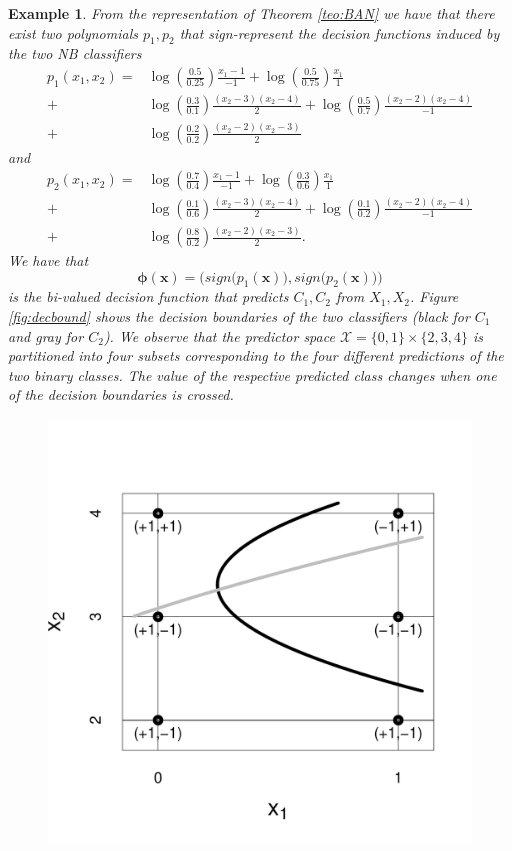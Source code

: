 \documentclass[11pt,a4paper, twoside]{book}
\newtheorem{example}{Example}[chapter]
\newcommand{\bchi}{\boldsymbol{\mathcal{X}}}
\begin{document}
\begin{example}
\begin{table}
\end{table}
From the representation of Theorem \ref{teo:BAN} we have that there exist two polynomials $p_1,p_2$ that sign-represent the decision functions induced by the two NB classifiers
\begin{align*}
p_1(x_1,x_2) =&\log\left(\frac{0.5}{0.25}\right) \frac{x_1-1}{-1} + \log\left( \frac{0.5}{0.75} \right) \frac{x_1}{1}  \\ 
          +& \log\left(\frac{0.3}{0.1}\right) \frac{(x_2-3)(x_2-4)}{2} + \log\left(\frac{0.5}{0.7}\right) \frac{(x_2-2)(x_2-4)}{-1} \\
   +& \log\left(\frac{0.2}{0.2}\right) \frac{(x_2-2)(x_2-3)}{2}
\end{align*} 
and
\begin{align*}
p_2(x_1,x_2)=&\log\left(\frac{0.7}{0.4}\right) \frac{x_1-1}{-1} + \log\left( \frac{0.3}{0.6} \right) \frac{x_1}{1}  \\ 
           +& \log\left(\frac{0.1}{0.6}\right) \frac{(x_2-3)(x_2-4)}{2} + \log\left(\frac{0.1}{0.2}\right) \frac{(x_2-2)(x_2-4)}{-1} \\ 
           + &\log\left(\frac{0.8}{0.2}\right) \frac{(x_2-2)(x_2-3)}{2}.
\end{align*} 
We have that
\[ \bm{\phi}(\mathbf{x})=\bigg( sign\big(p_1(\mathbf{x}) \big), sign\big( p_2(\mathbf{x}) \big) \bigg) \]
is the bi-valued decision function that predicts $C_1,C_2$ from $X_1,X_2$.
Figure \ref{fig:decbound} shows the decision boundaries of the two classifiers (black for $C_1$ and gray for $C_2$). We observe that the predictor space ${\bchi}=\{0,1\}\times\{2,3,4\}$ is partitioned into four subsets corresponding to the four different predictions of the two binary classes. The value of the respective predicted class changes when one of the decision boundaries is crossed. 
\begin{figure}[h!]
\centering
\includegraphics[scale=0.5]{ExampleBR}

\end{figure}
\end{example}
\end{document}
